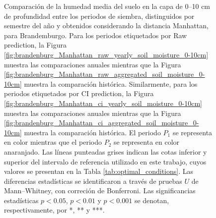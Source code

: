 \begin{figure}[htbp]
	\caption{
		Comparación de la humedad media del suelo en la capa de 0--10 cm de profundidad entre los periodos de siembra, distinguidos por semestre del año y obtenidos considerando la distancia Manhattan, para Brandemburgo. Para los periodos etiquetados por Raw prediction, la Figura \ref{fig:brandenburg_Manhattan_raw_yearly_soil_moisture_0-10cm} muestra las comparaciones anuales mientras que la Figura \ref{fig:brandenburg_Manhattan_raw_aggregated_soil_moisture_0-10cm} muestra la comparación histórica. Similarmente, para los periodos etiquetados por CI prediction, la Figura \ref{fig:brandenburg_Manhattan_ci_yearly_soil_moisture_0-10cm} muestra las comparaciones anuales mientras que la Figura \ref{fig:brandenburg_Manhattan_ci_aggregated_soil_moisture_0-10cm} muestra la comparación histórica. El periodo $P_1$ se representa en color mientras que el periodo $P_2$ se representa en color anaranjado. Las líneas punteadas grises indican las cotas inferior y superior del intervalo de referencia utilizado en este trabajo, cuyos valores se presentan en la Tabla \ref{tab:optimal_conditions}. Las diferencias estadísticas se identificaron a través de pruebas $U$ de Mann--Whitney, con correción de Bonferroni. Las significancias estadísticas $p<0.05$, $p<0.01$ y $p<0.001$ se denotan, respectivamente, por *, ** y ***.
	}
	\label{fig:brandenburg_Manhattan_soil_moisture_0-10cm}
	
	
\end{figure}



